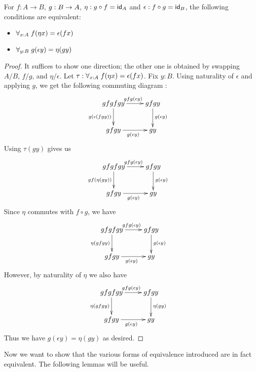 \begin{lem}\label{lem:coh-equiv}
For $f : A \to B$, $g:B\ra A$, $\eta: g \circ f = \idfunc[A]$ and $\epsilon:f \circ g = \idfunc[B]$, the following conditions are equivalent:
\begin{itemize}
\item $\forall_{x:A}\;\map{f}{\eta x} = \epsilon(fx)$
\item $\forall_{y:B}\; \map{g}{\epsilon y} = \eta(gy)$
\end{itemize}
\end{lem}
\begin{proof}
It suffices to show one direction; the other one is obtained by swapping $A/B$, $f/g$, and $\eta/\epsilon$. Let $\tau : \forall_{x:A}\;\map{f}{\eta x} = \epsilon(fx)$. Fix $y : B$. Using naturality of $\epsilon$ and applying $g$, we get the following commuting diagram :
\[\uppercurveobject{{ }}\lowercurveobject{{ }}\twocellhead{{ }}
  \xymatrix{gfgfgy \ar^{gfg(\epsilon y)}[r] \ar_{g(\epsilon (fgy))}[d] & gfgy \ar^{g(\epsilon y)}[d] \\ gfgy \ar_{g(\epsilon y)}[r] & gy
  }\]
Using $\tau(gy)$ gives us
\[\uppercurveobject{{ }}\lowercurveobject{{ }}\twocellhead{{ }}
  \xymatrix{gfgfgy \ar^{gfg(\epsilon y)}[r] \ar_{gf(\eta (gy))}[d] & gfgy \ar^{g(\epsilon y)}[d] \\ gfgy \ar_{g(\epsilon y)}[r] & gy
  }\]
Since $\eta$ commutes with $f \circ g$, we have
\[\uppercurveobject{{ }}\lowercurveobject{{ }}\twocellhead{{ }}
  \xymatrix{gfgfgy \ar^{gfg(\epsilon y)}[r] \ar_{\eta (gfgy)}[d] & gfgy \ar^{g(\epsilon y)}[d] \\ gfgy \ar_{g(\epsilon y)}[r] & gy
  }\]
However, by naturality of $\eta$ we also have
\[\uppercurveobject{{ }}\lowercurveobject{{ }}\twocellhead{{ }}
  \xymatrix{gfgfgy \ar^{gfg(\epsilon y)}[r] \ar_{\eta (gfgy)}[d] & gfgy \ar^{\eta(gy)}[d] \\ gfgy \ar_{g(\epsilon y)}[r] & gy 
  }\]
Thus we have $g(\epsilon y) = \eta(g y)$ as desired.
\end{proof}

Now we want to show that the various forms of equivalence introduced are in fact equivalent. The following lemmas will be useful.

